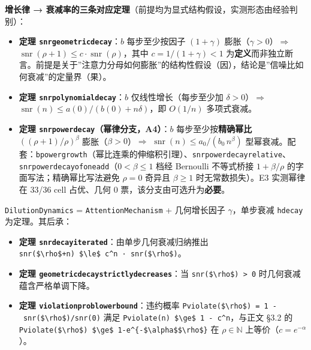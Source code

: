 \documentclass[
]{ctexart}
\providecommand{\tightlist}{%
  \setlength{\itemsep}{0pt}\setlength{\parskip}{0pt}}
\renewcommand{\_}{\discretionary{}{}{\textunderscore}}
\begin{document}
\textbf{增长律 →
衰减率的三条对应定理}（前提均为显式结构假设，实测形态由经验判别）：

\begin{itemize}
\tightlist
\item
  \textbf{定理 \texttt{snr\_geometric\_decay}}：\(b\) 每步至少按因子
  \((1+\gamma)\) 膨胀（\(\gamma>0\)）\(\Rightarrow\)
  \(\operatorname{snr}(\rho+1) \le c\cdot\operatorname{snr}(\rho)\)，其中
  \(c = 1/(1+\gamma) < 1\)
  为\textbf{定义}而非独立断言。前提是关于''注意力分母如何膨胀''的结构性假设（因），结论是''信噪比如何衰减''的定量界（果）。
\item
  \textbf{定理 \texttt{snr\_polynomial\_decay}}：\(b\)
  仅线性增长（每步至少加 \(\delta>0\)）\(\Rightarrow\)
  \(\operatorname{snr}(n) \le a(0)/(b(0)+n\delta)\)，即 \(O(1/n)\)
  多项式衰减。
\item
  \textbf{定理 \texttt{snr\_power\_decay}（幂律分支，A4）}：\(b\)
  每步至少按\textbf{精确幂比} \(((\rho+1)/\rho)^\beta\)
  膨胀（\(\beta>0\)）\(\Rightarrow\)
  \(\operatorname{snr}(n)\le a_0/(b_0\,n^\beta)\)
  型幂衰减。配套：\texttt{b\_power\_growth}（幂比连乘的伸缩积引理）、\texttt{snr\_power\_decay\_relative}、\texttt{snr\_power\_decay\_of\_one\_add}（\(0<\beta\le 1\)
  档经 Bernoulli 不等式桥接 \(1+\beta/\rho\)
  的字面写法；精确幂比写法避免 \(\rho=0\) 奇异且 \(\beta\ge1\)
  时无常数损失）。E3 实测幂律在 33/36 cell 占优、几何 0
  票，该分支由可选升为\textbf{必要}。
\end{itemize}

\texttt{DilutionDynamics} = \texttt{AttentionMechanism} + 几何增长因子
\(\gamma\)，单步衰减 \texttt{hdecay} 为定理。其后承：

\begin{itemize}
\tightlist
\item
  \textbf{定理 \texttt{snr\_decay\_iterated}}：由单步几何衰减归纳推出
  \texttt{snr(\$\textbackslash{}rho\$+n)\ \$\textbackslash{}le\$\ c\^{}n\ ·\ snr(\$\textbackslash{}rho\$)}。
\item
  \textbf{定理 \texttt{geometric\_decay\_strictly\_decreases}}：当
  \texttt{snr(\$\textbackslash{}rho\$)\ \textgreater{}\ 0}
  时几何衰减蕴含严格单调下降。
\item
  \textbf{定理 \texttt{violation\_prob\_lower\_bound}}：违约概率
  \texttt{P\_violate(\$\textbackslash{}rho\$)\ =\ 1\ -\ snr(\$\textbackslash{}rho\$)/snr(0)}
  满足
  \texttt{P\_violate(n)\ \$\textbackslash{}ge\$\ 1\ -\ c\^{}n}，与正文
  §3.2 的
  \texttt{P\_violate(\$\textbackslash{}rho\$)\ \$\textbackslash{}ge\$\ 1-e\^{}\{-\$\textbackslash{}alpha\$\$\textbackslash{}rho\$\}}
  在 \(\rho \in \mathbb{N}\) 上等价（\(c = e^{-\alpha}\)）。
\end{itemize}
\end{document}
